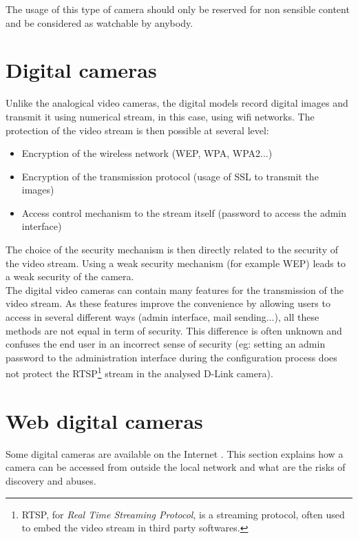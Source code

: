 The usage of this type of camera should only be reserved for non sensible content and be considered as watchable by anybody.

\section{Digital cameras}
\label{sec:cam-digital}

Unlike the analogical video cameras, the digital models record digital images and transmit it using numerical stream, in this case, using wifi networks.
The protection of the video stream is then possible at several level:\\

\begin{itemize}
\item Encryption of the wireless network (WEP, WPA, WPA2...)
\item Encryption of the transmission protocol (usage of SSL to transmit the images)
\item Access control mechanism to the stream itself (password to access the admin interface)
\end{itemize}

The choice of the security mechanism is then directly related to the security of the video stream.
Using a weak security mechanism (for example WEP) leads to a weak security of the camera.\\

The digital video cameras can contain many features for the transmission of the video stream.
As these features improve the convenience by allowing users to access in several different ways (admin interface, mail sending...), all these methods are not equal in term of security.
This difference is often unknown and confuses the end user in an incorrect sense of security (eg: setting an admin password to the administration interface during the configuration process does not protect the RTSP\footnote{RTSP, for \emph{Real Time Streaming Protocol}, is a streaming protocol, often used to embed the video stream in third party softwares.} stream in the analysed D-Link camera).

\section{Web digital cameras}
\label{sec:cam-google}

Some digital cameras are available on the Internet .
This section explains how a camera can be accessed from outside the local network and what are the risks of discovery and abuses.

